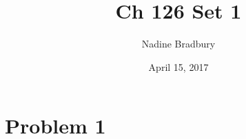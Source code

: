 \documentclass{article}
\title{Ch 126 Set 1}
\author{Nadine Bradbury }
\date{April 15, 2017}
\begin{document}
\maketitle

\section{Problem 1}
\end{document}
